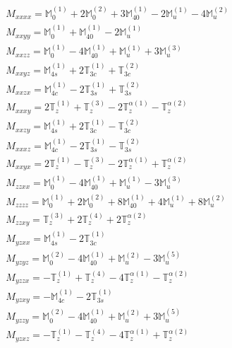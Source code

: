 \documentclass[fleqn,8pt,landscape]{jsarticle}
\begin{document}
\begin{align*}
& M_{xxxx} = \mathbb{M}_{0}^{(1)} + 2 \mathbb{M}_{0}^{(2)} + 3 \mathbb{M}_{40}^{(1)} - 2 \mathbb{M}_{u}^{(1)} - 4 \mathbb{M}_{u}^{(2)} \\
& M_{xxyy} = \mathbb{M}_{0}^{(1)} + \mathbb{M}_{40}^{(1)} - 2 \mathbb{M}_{u}^{(1)} \\
& M_{xxzz} = \mathbb{M}_{0}^{(1)} - 4 \mathbb{M}_{40}^{(1)} + \mathbb{M}_{u}^{(1)} + 3 \mathbb{M}_{u}^{(3)} \\
& M_{xxyz} = \mathbb{M}_{4s}^{(1)} + 2 \mathbb{T}_{3c}^{(1)} + \mathbb{T}_{3c}^{(2)} \\
& M_{xxzx} = \mathbb{M}_{4c}^{(1)} - 2 \mathbb{T}_{3s}^{(1)} + \mathbb{T}_{3s}^{(2)} \\
& M_{xxxy} = 2 \mathbb{T}_{z}^{(1)} + \mathbb{T}_{z}^{(3)} - 2 \mathbb{T}_{z}^{\alpha(1)} - \mathbb{T}_{z}^{\alpha(2)} \\
& M_{xxzy} = \mathbb{M}_{4s}^{(1)} + 2 \mathbb{T}_{3c}^{(1)} - \mathbb{T}_{3c}^{(2)} \\
& M_{xxxz} = \mathbb{M}_{4c}^{(1)} - 2 \mathbb{T}_{3s}^{(1)} - \mathbb{T}_{3s}^{(2)} \\
& M_{xxyx} = 2 \mathbb{T}_{z}^{(1)} - \mathbb{T}_{z}^{(3)} - 2 \mathbb{T}_{z}^{\alpha(1)} + \mathbb{T}_{z}^{\alpha(2)} \\
& M_{zzxx} = \mathbb{M}_{0}^{(1)} - 4 \mathbb{M}_{40}^{(1)} + \mathbb{M}_{u}^{(1)} - 3 \mathbb{M}_{u}^{(3)} \\
& M_{zzzz} = \mathbb{M}_{0}^{(1)} + 2 \mathbb{M}_{0}^{(2)} + 8 \mathbb{M}_{40}^{(1)} + 4 \mathbb{M}_{u}^{(1)} + 8 \mathbb{M}_{u}^{(2)} \\
& M_{zzxy} = \mathbb{T}_{z}^{(3)} + 2 \mathbb{T}_{z}^{(4)} + 2 \mathbb{T}_{z}^{\alpha(2)} \\
& M_{yzxx} = \mathbb{M}_{4s}^{(1)} - 2 \mathbb{T}_{3c}^{(1)} \\
& M_{yzyz} = \mathbb{M}_{0}^{(2)} - 4 \mathbb{M}_{40}^{(1)} + \mathbb{M}_{u}^{(2)} - 3 \mathbb{M}_{u}^{(5)} \\
& M_{yzzx} = - \mathbb{T}_{z}^{(1)} + \mathbb{T}_{z}^{(4)} - 4 \mathbb{T}_{z}^{\alpha(1)} - \mathbb{T}_{z}^{\alpha(2)} \\
& M_{yzxy} = - \mathbb{M}_{4c}^{(1)} - 2 \mathbb{T}_{3s}^{(1)} \\
& M_{yzzy} = \mathbb{M}_{0}^{(2)} - 4 \mathbb{M}_{40}^{(1)} + \mathbb{M}_{u}^{(2)} + 3 \mathbb{M}_{u}^{(5)} \\
& M_{yzxz} = - \mathbb{T}_{z}^{(1)} - \mathbb{T}_{z}^{(4)} - 4 \mathbb{T}_{z}^{\alpha(1)} + \mathbb{T}_{z}^{\alpha(2)}
\end{align*}
\end{document}
